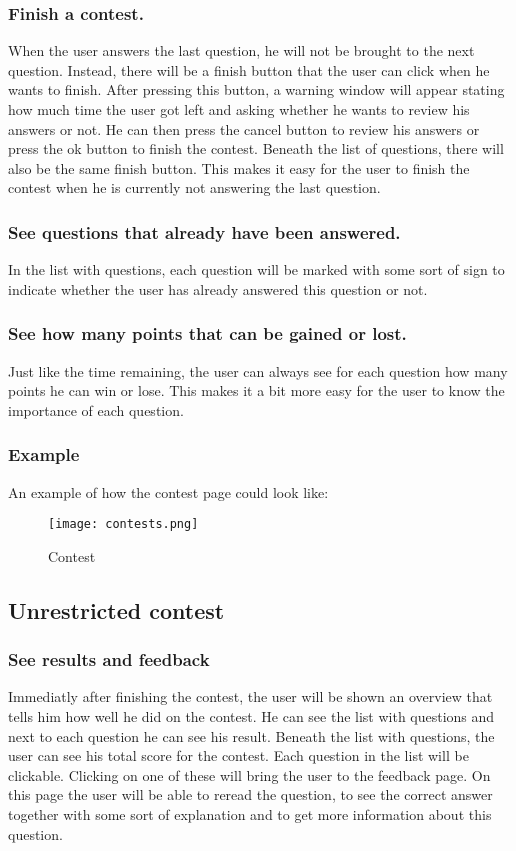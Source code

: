 \subsubsection*{Finish a contest.} 
When the user answers the last question, he will not be brought to the next question. Instead, there will be a finish button that the user can click when he wants to finish. After pressing this button, a warning window will appear stating how much time the user got left and asking whether he wants to review his answers or not. He can then press the cancel button to review his answers or press the ok button to finish the contest. Beneath the list of questions, there will also be the same finish button. This makes it easy for the user to finish the contest when he is currently not answering the last question. 

\subsubsection*{See questions that already have been answered.} 
In the list with questions, each question will be marked with some sort of sign to indicate whether the user has already answered this question or not. 

\subsubsection*{See how many points that can be gained or lost.}
Just like the time remaining, the user can always see for each question how many points he can win or lose. This makes it a bit more easy for the user to know the importance of each question. 

\subsubsection*{Example}
An example of how the contest page could look like: 
		\begin{figure}[h]
		  \centering
			\texttt{[image: contests.png]}
		  \caption{Contest}
		  \label{Contest}
		\end{figure}

\subsection*{Unrestricted contest}

\subsubsection*{See results and feedback}
Immediatly after finishing the contest, the user will be shown an overview that tells him how well he did on the contest. He can see the list with questions and next to each question he can see his result. Beneath the list with questions, the user can see his total score for the contest. Each question in the list will be clickable. Clicking on one of these will bring the user to the feedback page. On this page the user will be able to reread the question, to see the correct answer together with some sort of explanation and to get more information about this question.  

